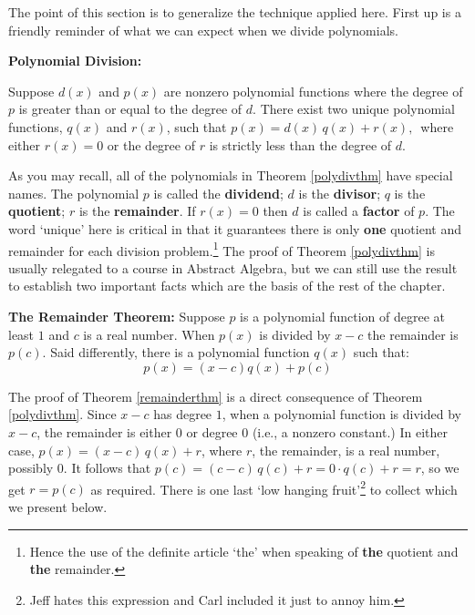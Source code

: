 \documentclass{ximera}
\begin{document}
The point of this section is to generalize the technique applied here.  First up is a friendly reminder of what we can expect when we divide polynomials.

\smallskip

\colorbox{ResultColor}{\bbm

\begin{thm} \label{polydivthm} \textbf{Polynomial Division:} 

Suppose $d(x)$ and $p(x)$ are nonzero polynomial functions where the degree of $p$ is greater than or equal to the degree of $d$.  There exist two unique polynomial functions, $q(x)$ and $r(x)$, such that $p(x) = d(x) \, q(x) + r(x),\,$ where either $r(x) = 0$ or the degree of $r$ is strictly less than the degree of $d$.
\end{thm}
\ebm}

\medskip

As you may recall, all of the polynomials in Theorem \ref{polydivthm} have special names.  The polynomial $p$ is called the  \textbf{dividend}; $d$ is the  \textbf{divisor}; $q$ is the  \textbf{quotient}; $r$ is the  \textbf{remainder}.  If $r(x)=0$ then $d$ is called a  \textbf{factor} of $p$.  The word `unique' here is critical in that it guarantees there is only \textbf{one} quotient and remainder for each division problem.\footnote{Hence the use of the definite article `the' when speaking of \textbf{the} quotient and \textbf{the} remainder.} The proof of Theorem \ref{polydivthm} is usually relegated to a course in Abstract Algebra, but we can still use the result to establish two important facts which are the basis of the rest of the chapter.

\medskip

\colorbox{ResultColor}{\bbm

\begin{thm} \label{remainderthm}\textbf{The Remainder Theorem:}  
Suppose $p$ is a polynomial function of degree at least $1$ and $c$ is a real number.  When $p(x)$ is divided by $x-c$ the remainder is $p(c)$.  Said differently, there is a polynomial  function $q(x)$ such that:  \[ p(x) = (x-c) q(x) + p(c)\]

\end{thm}
\ebm}

\medskip


The proof of Theorem \ref{remainderthm} is a direct consequence of Theorem \ref{polydivthm}.  Since  $x-c$ has degree $1$, when a polynomial function is divided by $x-c$, the remainder is either $0$ or degree $0$ (i.e., a nonzero constant.)   In either case, $p(x) = (x-c) \, q(x) + r$, where $r$, the remainder, is a real number, possibly $0$.  It follows that $p(c) = (c-c) \, q(c) + r = 0 \cdot q(c) + r = r$, so we get $r = p(c)$ as required.  There is one last `low hanging fruit'\footnote{Jeff hates this expression and Carl included it just to annoy him.} to collect which we present below.
\end{document}
